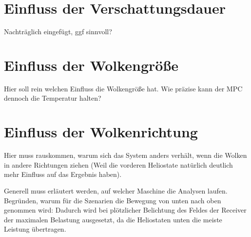 \section{Einfluss der Verschattungsdauer} \label{sec_Verschattungsdauer}
Nachträglich eingefügt, ggf sinnvoll?

\section{Einfluss der Wolkengröße} \label{sec_EinflussGröße}
Hier soll rein welchen Einfluss die Wolkengröße hat.
Wie präzise kann der MPC dennoch die Temperatur halten?

\section{Einfluss der Wolkenrichtung} \label{sec_EinflussRichtung}
Hier muss rauskommen, warum sich das System anders verhält, wenn die Wolken in andere Richtungen ziehen (Weil die vorderen Heliostate natürlich deutlich mehr Einfluss auf das Ergebnis haben).

Generell muss erläutert werden, auf welcher Maschine die Analysen laufen.
Begründen, warum für die Szenarien die Bewegung von unten nach oben genommen wird: Dadurch wird bei plötzlicher Belichtung des Feldes der Receiver der maximalen Belastung ausgesetzt, da die Heliostaten unten die meiste Leistung übertragen.
